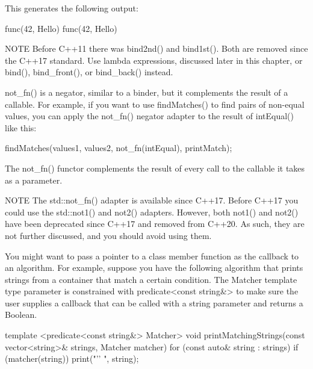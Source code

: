 This generates the following output:

\begin{shell}
func(42, Hello)
func(42, Hello)
\end{shell}

\begin{myNotic}{NOTE}
Before C++11 there was bind2nd() and bind1st(). Both are removed since the C++17 standard. Use lambda expressions, discussed later in this chapter, or bind(), bind\_front(), or bind\_back() instead.
\end{myNotic}


not\_fn() is a negator, similar to a binder, but it complements the result of a callable. For example, if you want to use findMatches() to find pairs of non-equal values, you can apply the not\_fn() negator adapter to the result of intEqual() like this:

\begin{cpp}
findMatches(values1, values2, not_fn(intEqual), printMatch);
\end{cpp}

The not\_fn() functor complements the result of every call to the callable it takes as a parameter.


\begin{myNotic}{NOTE}
The std::not\_fn() adapter is available since C++17. Before C++17 you could use the std::not1() and not2() adapters. However, both not1() and not2() have been deprecated since C++17 and removed from C++20. As such, they are not further discussed, and you should avoid using them.
\end{myNotic}


You might want to pass a pointer to a class member function as the callback to an algorithm. For example, suppose you have the following algorithm that prints strings from a container that match a certain condition. The Matcher template type parameter is constrained with predicate<const string\&> to make sure the user supplies a callback that can be called with a string parameter and returns a Boolean.

\begin{cpp}
template <predicate<const string&> Matcher>
void printMatchingStrings(const vector<string>& strings, Matcher matcher)
{
    for (const auto& string : strings) {
        if (matcher(string)) { print("'{}' ", string); }
    }
}
\end{cpp}

